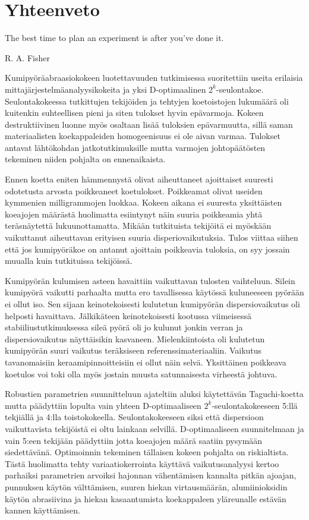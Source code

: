 \documentclass[12pt,a4paper,finnish]{tutthesis}
\begin{document}
\chapter{Yhteenveto}
\label{ch:concl}

\epigraph{The best time to plan an experiment is after you’ve done it.}{R. A. Fisher}

Kumipyöräabraasiokokeen luotettavuuden tutkimisessa suoritettiin
useita erilaisia mittajärjestelmäanalyysikokeita ja yksi
D-optimaalinen $2^k$-seulontakoe. Seulontakokeessa tutkittujen tekijöiden ja tehtyjen
koetoistojen lukumäärä oli kuitenkin suhteellisen pieni
ja siten tulokset hyvin epävarmoja.
Kokeen destruktiivinen luonne myös osaltaan lisää tuloksien
epävarmuutta, sillä saman materiaalisten koekappaleiden homogeenisuus
ei ole aivan varmaa.
Tulokset antavat lähtökohdan jatkotutkimuksille mutta varmojen
johtopäätösten tekeminen niiden pohjalta on ennenaikaista.

Ennen koetta eniten hämmennystä olivat aiheuttaneet ajoittaiset suuresti odotetusta
arvosta poikkeaneet koetulokset. Poikkeamat olivat useiden kymmenien
milligrammojen luokkaa. Kokeen aikana ei suuresta yksittäisten koeajojen määrästä
huolimatta esiintynyt näin suuria poikkeamia yhtä teräsnäytettä lukuunottamatta.
Mikään tutkituista tekijöitä ei myöskään vaikuttanut aiheuttavan
erityisen suuria disperiovaikutuksia. Tulos viittaa siihen että jos kumipyöräkoe
on antanut ajoittain poikkeavia tuloksia, on syy jossain muualla kuin tutkituissa
tekijöissä.

Kumipyörän kulumisen asteen havaittiin vaikuttavan tulosten vaihteluun.
Silein kumipyörä vaikutti parhaalta mutta ero tavallisessa käytössä kuluneeseen
pyörään ei ollut iso. Sen sijaan keinotekoisesti kulutetun kumipyörän dispersiovaikutus
oli helposti havaittava. Jälkikäteen keinotekoisesti kootussa viimeisessä stabiiliustutkimuksessa
sileä pyörä oli jo kulunut jonkin verran ja dispersiovaikutus näyttäisikin kasvaneen.
Mielenkiintoista oli kulutetun kumipyörän suuri vaikutus teräksiseen referenssimateriaaliin.
Vaikutus tavanomaisiin keraamipinnoitteisiin ei ollut näin selvä. Yksittäinen poikkeava
koetulos voi toki olla myös jostain muusta satunnaisesta virheestä johtuva.

Robustien parametrien suunnitteluun ajateltiin aluksi käytettävän
Taguchi-koetta mutta päädyttiin lopulta vain yhteen D-optimaaliseen
$2^k$-seulontakokeeseen 5:llä tekjiällä ja 4:lla toistokokeella.
Seulontakokeeseen siksi että dispersioon
vaikuttavista tekijöistä ei oltu lainkaan selvillä. D-optimaaliseen suunnitelmaan
ja vain 5:een tekijään päädyttiin jotta koeajojen määrä saatiin pysymään
siedettävänä. Optimoinnin tekeminen tällaisen kokeen pohjalta on
riskialtista. Tästä huolimatta tehty variaatiokerrointa käyttävä vaikutusanalyysi kertoo parhaiksi parametrien arvoiksi hajonnan vähentämisen kannalta pitkän ajoajan, punnuksen käytön välttämisen, suuren hiekan virtausmäärän, alumiinioksidin käytön abrasiivina ja hiekan kasaantumista koekappaleen yläreunalle estävän kannen käyttämisen.
\end{document}
